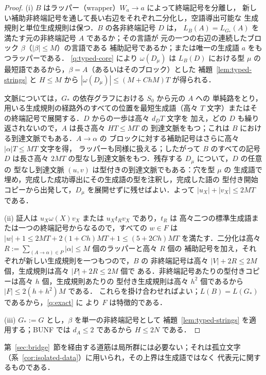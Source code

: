 \documentclass[11pt,a4paper]{ltjsarticle}
\numberwithin{equation}{section}
\theoremstyle{plain}
\theoremstyle{definition}
\theoremstyle{remark}
\theoremstyle{plain}
\begin{document}
\begin{proof}
(i) $B$ はラッパー（wrapper）$W_a\to a$ によって終端記号を分離し，
新しい補助非終端記号を通して長い右辺をそれぞれ二分化し，空語導出可能な
生成規則と単位生成規則は保つ．$B$ の各非終端記号 $D$ は，
$L_B(A)=L_{G_*}(A)$ を満たす元の非終端記号 $A$ であるか；その言語が
元の一つの右辺の連続したブロック $\beta$（$|\beta|\le M$）の言語である
補助記号であるか；または唯一の生成語 $a$ をもつラッパーである．
\ref{q:typed-core} により $\omega(D_\mu)$ は $L_B(D)$ における型 $\mu$ の
最短語であるから，$\beta=A$（あるいはそのブロック）とした
補題~\ref{lem:typed-strings} と $H\le M$ から
$|\omega(D_\mu)|\le(M+ChM)T$ が得られる．

文脈については，$G_*$ の依存グラフにおける $S_0$ から元の $A$ への
単純路をとり，用いる生成規則の経路外のすべての位置を最短生成語（高々 $T$
文字）またはその終端記号で展開する．$D$ からの一歩は高々 $d_DT$ 文字を
加え，どの $D$ も繰り返されないので，$A$ は長さ高々 $HT\le MT$ の
到達文脈をもつ；これは $B$ における到達文脈でもある．$A\to\alpha$ の
ブロックに対する補助記号はさらに高々 $|\alpha|T\le MT$ 文字を得，
ラッパーも同様に扱える；したがって $B$ のすべての記号 $D$ は長さ高々
$2MT$ の型なし到達文脈をもつ．残存する $D_\mu$ について，$D$ の任意の
型なし到達文脈 $(u,v)$ は型付きの到達文脈でもある：穴を型 $\mu$ の
生成語で埋め，完成した成功導出にその生成語の型を注釈し，完成した語の
型付き開始コピーから出発して，$D_\mu$ を展開せずに残せばよい．よって
$|u_X|+|v_X|\le2MT$ である．

(ii) 証人は $u_X\omega(X)v_X$ または $u_Xt_Rv_X$ であり，$t_R$ は
高々二つの標準生成語または一つの終端記号からなるので，すべての $w\in F$
は $|w|+1\le2MT+2(1+Ch)MT+1\le(5+2Ch)MT$ を満たす．二分化は高々
$R:=\sum_{(A\to\alpha)\in P}|\alpha|\le M$ 個のラッパーと高々 $R$ 個の
補助記号を加え，それぞれが新しい生成規則を一つもつので，$B$ の
非終端記号は高々 $|V|+2R\le2M$ 個，生成規則は高々 $|P|+2R\le2M$ 個で
ある．非終端記号あたりの型付きコピーは高々 $h$ 個，生成規則あたりの
型付き生成規則は高々 $h^2$ 個であるから $|F|\le2(h+h^2)M$ である．
これらを掛け合わせればよい；$L(B)=L(G_*)$ であるから，\ref{q:exact} に
より $F$ は特徴的である．

(iii) $G_*:=G$ とし，$\beta$ を単一の非終端記号として
補題~\ref{lem:typed-strings} を適用する；BUNF では $d_A\le2$ であるから
$H\le2N$ である．
\end{proof}

第~\ref{sec:bridge}~節を経由する道筋は局所群には必要ない；それは孤立文字
（系~\ref{cor:isolated-data}）に用いられ，その上界は生成語ではなく
代表元に関するものである．
\end{document}
